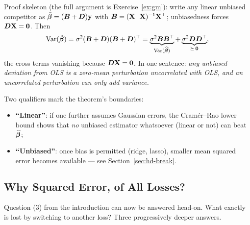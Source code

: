 Proof skeleton (the full argument is Exercise~\ref{ex:gm}): write any linear unbiased competitor as $\tilde{\bm{\beta}} = (\bm{B} + \bm{D})\mathbf{y}$ with $\bm{B} = (\mathbf{X}^\top\mathbf{X})^{-1}\mathbf{X}^\top$; unbiasedness forces $\bm{D}\mathbf{X} = \mathbf{0}$. Then
\[
  \mathrm{Var}(\tilde{\bm{\beta}}) = \sigma^2(\bm{B} + \bm{D})(\bm{B} + \bm{D})^\top
  = \underbrace{\sigma^2 \bm{B}\bm{B}^\top}_{\mathrm{Var}(\widehat{\bm{\beta}})} + \underbrace{\sigma^2 \bm{D}\bm{D}^\top}_{\succeq\, \mathbf{0}},
\]
the cross terms vanishing because $\bm{D}\mathbf{X} = \mathbf{0}$. In one sentence: \textit{any unbiased deviation from OLS is a zero-mean perturbation uncorrelated with OLS, and an uncorrelated perturbation can only add variance.}

Two qualifiers mark the theorem's boundaries:
\begin{itemize}
  \item \textbf{``Linear''}: if one further assumes Gaussian errors, the Cram\'er--Rao lower bound shows that \textit{no} unbiased estimator whatsoever (linear or not) can beat $\widehat{\bm{\beta}}$;
  \item \textbf{``Unbiased''}: once bias is permitted (ridge, lasso), smaller mean squared error becomes available — see Section~\ref{sec:hd-break}.
\end{itemize}

\subsection{Why Squared Error, of All Losses?}\label{sec:why-square}

Question (3) from the introduction can now be answered head-on. What exactly is lost by switching to another loss? Three progressively deeper answers.

